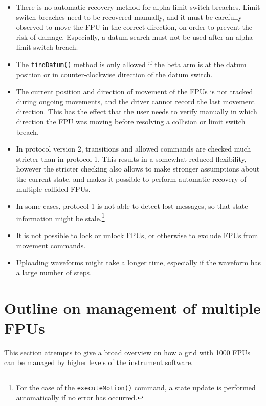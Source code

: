 \documentclass{scrartcl}[12pt,a4paper]
\begin{document}
\begin{itemize}
\item There is no automatic recovery method for alpha
  limit switch breaches. Limit switch breaches need
  to be recovered manually, and it must be carefully
  observed to move the FPU in the correct direction,
  on order to prevent the risk of damage. Especially,
  a datum search must not be used after an alpha limit switch
  breach.

\item The \texttt{findDatum()} method is only allowed if the beta arm
  is at the datum position or in counter-clockwise direction of the
  datum switch.

\item The current position and direction of movement of the FPUs is
  not tracked during ongoing movements, and the driver cannot record
  the last movement direction. This has the effect that the user needs
  to verify manually in which direction the FPU was moving before
  resolving a collision or limit switch breach.

\item In protocol version 2, transitions and allowed commands are
  checked much stricter than in protocol 1.  This results in a
  somewhat reduced flexibility, however the stricter checking also
  allows to make stronger assumptions about the current state, and
  makes it possible to perform automatic recovery of multiple collided
  FPUs.
  
\item In some cases, protocol 1 is not able to
  detect lost messages, so that state information
  might be stale.\footnote{For the case of the \texttt{executeMotion()}
  command, a state update is performed automatically
  if no error has occurred.}

\item It is not possible to lock or unlock FPUs, or otherwise to
  exclude FPUs from movement commands.
  
\item Uploading waveforms might take a longer time, especially if the
  waveform has a large number of steps.
  
\end{itemize}

\section{Outline on management of multiple FPUs}

This section attempts to give a broad overview on how a grid with 1000
FPUs can be managed by higher levels of the instrument software.
\end{document}
